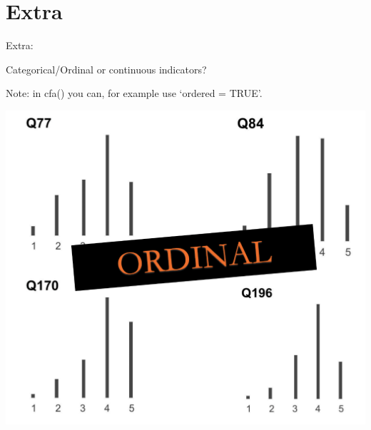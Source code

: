 \documentclass[10pt]{beamer}\usepackage[]{graphicx}\usepackage[]{xcolor}
\begin{document}
\section{Extra}

\begin{frame}
	
	\begin{center}
		\Huge{Extra:}
		
		\large{Categorical/Ordinal or continuous indicators?}
	\end{center}
	
	\vspace*{15mm}
	
	Note: in cfa() you can, for example use `ordered = TRUE'.
	
\end{frame}

\begin{frame}
	
	\includegraphics[width=\linewidth,height=\textheight,keepaspectratio]{images/slide21.png}
	
\end{frame}

\end{document}

